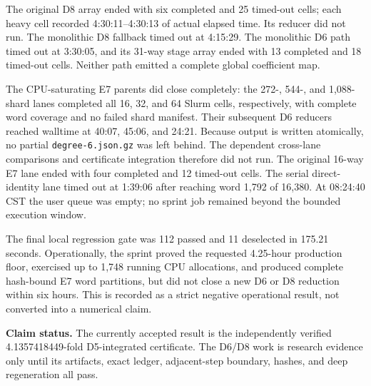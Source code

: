 \documentclass[10pt]{article}
\begin{document}
The original D8 array ended with six completed and 25 timed-out cells; each
heavy cell recorded 4:30:11--4:30:13 of actual elapsed time.  Its reducer did
not run.  The monolithic D8 fallback timed out at 4:15:29.  The monolithic D6
path timed out at 3:30:05, and its 31-way stage array ended with 13 completed
and 18 timed-out cells.  Neither path emitted a complete global coefficient
map.

The CPU-saturating E7 parents did close completely: the 272-, 544-, and
1,088-shard lanes completed all 16, 32, and 64 Slurm cells, respectively, with
complete word coverage and no failed shard manifest.  Their subsequent D6
reducers reached walltime at 40:07, 45:06, and 24:21.  Because output is written
atomically, no partial \texttt{degree-6.json.gz} was left behind.  The dependent
cross-lane comparisons and certificate integration therefore did not run.
The original 16-way E7 lane ended with four completed and 12 timed-out cells.
The serial direct-identity lane timed out at 1:39:06 after reaching word 1,792
of 16,380.  At 08:24:40 CST the user queue was empty; no sprint job remained
beyond the bounded execution window.

The final local regression gate was 112 passed and 11 deselected in 175.21
seconds.  Operationally, the sprint proved the requested 4.25-hour production
floor, exercised up to 1,748 running CPU allocations, and produced complete
hash-bound E7 word partitions, but did not close a new D6 or D8 reduction
within six hours.  This is recorded as a strict negative operational result,
not converted into a numerical claim.

\textbf{Claim status.}  The currently accepted result is the independently
verified 4.1357418449-fold D5-integrated certificate.  The D6/D8 work is
research evidence only until its artifacts, exact ledger, adjacent-step
boundary, hashes, and deep regeneration all pass.
\end{document}
